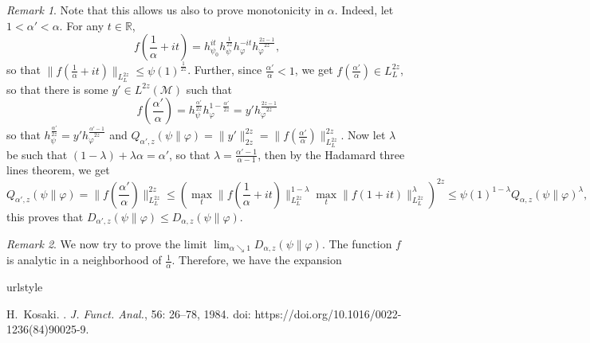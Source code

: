 \documentclass[12pt]{article}
\theoremstyle{definition}
\theoremstyle{remark}
\newtheorem{remark}{Remark}
\def\Me{\mathcal M}
\begin{document}
\begin{remark} Note that this allows us also to prove monotonicity in $\alpha$. Indeed,
let $1<\alpha'<\alpha$. For any $t\in \mathbb R$,
\[
f(\frac1{\alpha}+it)=h_{\psi_0}^{it}h_\psi^{\frac{1}{2z}}h_\varphi^{-it}h_\varphi^{\frac{2z-1}{2z}},
\]
so that $\|f(\frac1{\alpha}+it)\|_{L^{2z}_L}\le \psi(1)^{\frac1{2z}}$. Further, since
$\frac{\alpha'}{\alpha}<1$, we get $f(\frac{\alpha'}{\alpha})\in L^{2z}_L$, so that there is some $y'\in
L^{2z}(\Me)$ such that 
\[
f(\frac{\alpha'}{\alpha})=h_\psi^{\frac{\alpha'}{2z}}h_\varphi^{1-\frac{\alpha'}{2z}}=y'h_\varphi^{\frac{2z-1}{2z}}
\]
so that $h_\psi^{\frac{\alpha'}{2z}}=y'h_\varphi^{\frac{\alpha'-1}{2z}}$ and
$Q_{\alpha',z}(\psi\|\varphi)=\|y'\|^{2z}_{2z}=\|f(\frac{\alpha'}{\alpha})\|_{L^{2z}_L}^{2z}$. Now let $\lambda$ be such that
$(1-\lambda)+\lambda \alpha=\alpha'$, so that $\lambda=\frac{\alpha'-1}{\alpha-1}$, then
by the Hadamard three lines theorem, we get
\[
Q_{\alpha',z}(\psi\|\varphi)=\|f(\frac{\alpha'}{\alpha})\|^{2z}_{L^{2z}_L}\le \left(\max_t
\|f(\frac1{\alpha}+it)\|_{L^{2z}_L}^{1-\lambda}\max_t\|f(1+it)\|_{L^{2z}_L}^\lambda\right)^{2z}\le
\psi(1)^{1-\lambda}Q_{\alpha,z}(\psi\|\varphi)^\lambda,
\]
this proves that $D_{\alpha',z}(\psi\|\varphi)\le D_{\alpha,z}(\psi\|\varphi)$. 
\end{remark}


\begin{remark} We now try to prove the limit $\lim_{\alpha \searrow 1}
D_{\alpha,z}(\psi\|\varphi)$. The function $f$ is analytic in a neighborhood of
$\frac1{\alpha}$. Therefore, we have the expansion 


\end{remark}



\begin{thebibliography}{5}
\providecommand{\natexlab}[1]{#1}
\providecommand{\url}[1]{\texttt{#1}}
\expandafter\ifx\csname urlstyle\endcsname\relax
  \providecommand{\doi}[1]{doi: #1}\else
  \providecommand{\doi}{doi: \begingroup \urlstyle{rm}\Url}\fi



H.~Kosaki.
.
\newblock \emph{{J. Funct. Anal.}}, {56}: {26--78}, {1984}.
\newblock \doi{https://doi.org/10.1016/0022-1236(84)90025-9}.

\end{thebibliography}
\end{document}
